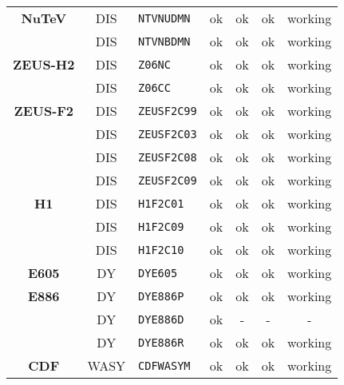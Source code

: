 \begin{table}[H]
\begin{centering}
\begin{tabular}{|c|c|l|c|c|c|c|}
\hline 
\textbf{\scriptsize NuTeV} & {\scriptsize DIS} & \texttt{\scriptsize NTVNUDMN} & {\scriptsize ok} & {\scriptsize ok} & {\scriptsize ok} & {\scriptsize working}\tabularnewline
\cline{2-7} 
 & {\scriptsize DIS} & \texttt{\scriptsize NTVNBDMN} & {\scriptsize ok} & {\scriptsize ok} & {\scriptsize ok} & {\scriptsize working}\tabularnewline
\hline 
\textbf{\scriptsize ZEUS-H2} & {\scriptsize DIS} & \texttt{\scriptsize Z06NC} & {\scriptsize ok} & {\scriptsize ok} & {\scriptsize ok} & {\scriptsize working}\tabularnewline
\cline{2-7} 
 & {\scriptsize DIS} & \texttt{\scriptsize Z06CC} & {\scriptsize ok} & {\scriptsize ok} & {\scriptsize ok} & {\scriptsize working}\tabularnewline
\hline 
\textbf{\scriptsize ZEUS-F2} & {\scriptsize DIS} & \texttt{\scriptsize ZEUSF2C99} & {\scriptsize ok} & {\scriptsize ok} & {\scriptsize ok} & {\scriptsize working}\tabularnewline
\cline{2-7} 
 & {\scriptsize DIS} & \texttt{\scriptsize ZEUSF2C03} & {\scriptsize ok} & {\scriptsize ok} & {\scriptsize ok} & {\scriptsize working}\tabularnewline
\cline{2-7} 
 & {\scriptsize DIS} & \texttt{\scriptsize ZEUSF2C08} & {\scriptsize ok} & {\scriptsize ok} & {\scriptsize ok} & {\scriptsize working}\tabularnewline
\cline{2-7} 
 & {\scriptsize DIS} & \texttt{\scriptsize ZEUSF2C09} & {\scriptsize ok} & {\scriptsize ok} & {\scriptsize ok} & {\scriptsize working}\tabularnewline
\hline 
\textbf{\scriptsize H1} & {\scriptsize DIS} & \texttt{\scriptsize H1F2C01} & {\scriptsize ok} & {\scriptsize ok} & {\scriptsize ok} & {\scriptsize working}\tabularnewline
\cline{2-7} 
 & {\scriptsize DIS} & \texttt{\scriptsize H1F2C09} & {\scriptsize ok} & {\scriptsize ok} & {\scriptsize ok} & {\scriptsize working}\tabularnewline
\cline{2-7} 
 & {\scriptsize DIS} & \texttt{\scriptsize H1F2C10} & {\scriptsize ok} & {\scriptsize ok} & {\scriptsize ok} & {\scriptsize working}\tabularnewline
\hline 
\textbf{\scriptsize E605} & {\scriptsize DY} & \texttt{\scriptsize DYE605} & {\scriptsize ok} & {\scriptsize ok} & {\scriptsize ok} & {\scriptsize working}\tabularnewline
\hline 
\textbf{\scriptsize E886} & {\scriptsize DY} & \texttt{\scriptsize DYE886P} & {\scriptsize ok} & {\scriptsize ok} & {\scriptsize ok} & {\scriptsize working}\tabularnewline
\cline{3-7} 
 & {\scriptsize DY} & \texttt{\scriptsize DYE886D} & {\scriptsize ok} & {\scriptsize -} & {\scriptsize -} & {\scriptsize -}\tabularnewline
\cline{3-7} 
 & {\scriptsize DY} & \texttt{\scriptsize DYE886R} & {\scriptsize ok} & {\scriptsize ok} & {\scriptsize ok} & {\scriptsize working}\tabularnewline
\hline 
\textbf{\scriptsize CDF} & {\scriptsize WASY} & \texttt{\scriptsize CDFWASYM} & {\scriptsize ok} & {\scriptsize ok} & {\scriptsize ok} & {\scriptsize working}\tabularnewline

\end{tabular}
\end{centering}
\end{table}

